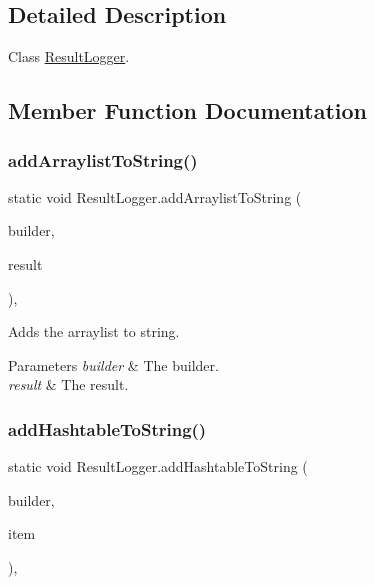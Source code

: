 \subsection{Detailed Description}
Class \hyperlink{class_result_logger}{Result\+Logger}. 



\subsection{Member Function Documentation}
\mbox{\label{class_result_logger_af10a2cf057bfc480f11b179607748493}} 
\subsubsection{\texorpdfstring{add\+Arraylist\+To\+String()}{addArraylistToString()}}
{\footnotesize\ttfamily static void Result\+Logger.\+add\+Arraylist\+To\+String (\begin{DoxyParamCaption}\item[{String\+Builder}]{builder,  }\item[{Array\+List}]{result }\end{DoxyParamCaption})\hspace{0.3cm}{\ttfamily [inline]}, {\ttfamily [static]}}



Adds the arraylist to string. 


\begin{DoxyParams}{Parameters}
{\em builder} & The builder.\\
\hline
{\em result} & The result.\\
\hline
\end{DoxyParams}
\mbox{\label{class_result_logger_aebd3a60183173fd32fbcb84c9ca1cbc5}} 
\subsubsection{\texorpdfstring{add\+Hashtable\+To\+String()}{addHashtableToString()}}
{\footnotesize\ttfamily static void Result\+Logger.\+add\+Hashtable\+To\+String (\begin{DoxyParamCaption}\item[{String\+Builder}]{builder,  }\item[{Hashtable}]{item }\end{DoxyParamCaption})\hspace{0.3cm}{\ttfamily [inline]}, {\ttfamily [static]}}



